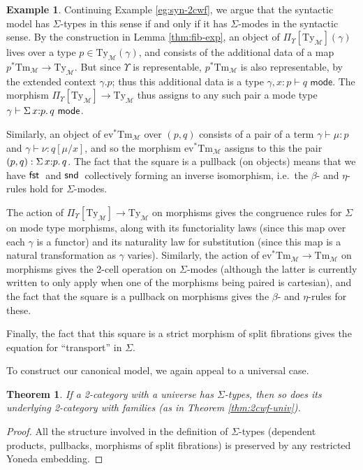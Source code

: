 \documentclass[10pt]{article}
\newtheorem{theorem}{Theorem}
\theoremstyle{definition}
\newtheorem{example}{Example}
\newcommand\dsd[1]{\ensuremath{\mathsf{#1}}}
\newcommand{\yields}{\vdash}
\newcommand{\type}{\,\,\mathsf{mode}}
\newcommand{\app}[2]{\ensuremath{#1 \: #2}}
\newcommand{\sigmacl}[3]{\ensuremath{\textnormal{$\Sigma$}\,#1{:}#2.\,#3}}
\newcommand{\fst}[1]{\app{\dsd{fst}}{#1}}
\newcommand{\snd}[1]{\app{\dsd{snd}}{#1}}
\newcommand\M{\mathcal{M}}
\newcommand\Mty{{\mathrm{Ty}_{\M}}}
\newcommand\Mtm{{\mathrm{Tm}_{\M}}}
\newcommand\Ups{\Upsilon}
\newcommand\ev{\mathrm{ev}}
\begin{document}
\begin{example}\label{eg:syn-sig}
  Continuing Example \ref{eg:syn-2cwf}, we argue that the syntactic model has $\Sigma$-types in this sense if and only if it has $\Sigma$-modes in the syntactic sense.
By the construction in Lemma \ref{thm:fib-exp}, an object of $\Pi_\Ups[\Mty](\gamma)$ lives over a type $p\in \Mty(\gamma)$, and consists of the additional data of a map $p^*\Mtm \to \Mty$.
But since $\Ups$ is representable, $p^* \Mtm$ is also representable, by the extended context $\gamma.p$; thus this additional data is a type $\gamma,x:p \yields q \type$.
The morphism $\Pi_\Ups[\Mty] \to \Mty$ thus assigns to any such pair a mode type $\gamma \yields \sigmacl{x}{p}{q} \type$.

Similarly, an object of $\ev^* \Mtm$ over $(p,q)$ consists of a pair of a term $\gamma \yields \mu : p$ and $\gamma \yields \nu : q[\mu/x]$, and so the morphism $\ev^* \Mtm$ assigns to this the pair $(p,q):\sigmacl{x}{p}{q}$.
The fact that the square is a pullback (on objects) means that we have $\fst$ and $\snd$ collectively forming an inverse isomorphism, i.e.\ the $\beta$- and $\eta$-rules hold for $\Sigma$-modes.

The action of $\Pi_\Ups[\Mty] \to \Mty$ on morphisms gives the congruence rules for $\Sigma$ on mode type morphisms, along with its functoriality laws (since this map over each $\gamma$ is a functor) and its naturality law for substitution (since this map is a natural transformation as $\gamma$ varies).
Similarly, the action of $\ev^* \Mtm \to \Mtm$ on morphisms gives the 2-cell operation on $\Sigma$-modes (although the latter is currently written to only apply when one of the morphisms being paired is cartesian), and the fact that the square is a pullback on morphisms gives the $\beta$- and $\eta$-rules for these.

Finally, the fact that this square is a strict morphism of split fibrations gives the equation for ``transport'' in $\Sigma$.
\end{example}

To construct our canonical model, we again appeal to a universal case.

\begin{theorem}\label{thm:sig-univ}
  If a 2-category with a universe has $\Sigma$-types, then so does its underlying 2-category with families (as in Theorem \ref{thm:2cwf-univ}).
\end{theorem}
\begin{proof}
  All the structure involved in the definition of $\Sigma$-types (dependent products, pullbacks, morphisms of split fibrations) is preserved by any restricted Yoneda embedding.
\end{proof}
\end{document}
